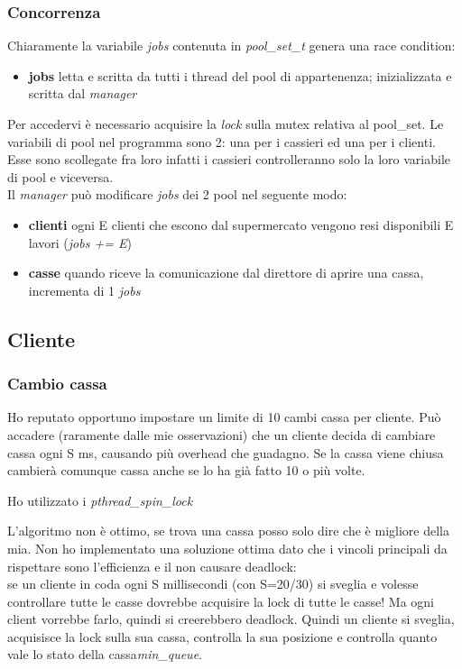 \documentclass[11pt, a4paper]{article}
\begin{document}
\subsubsection{Concorrenza}
Chiaramente la variabile \textit{jobs} contenuta in \textit{pool\_set\_t} genera una race condition:
\begin{itemize}
\item \textbf{jobs}	letta e scritta da tutti i thread del pool di appartenenza; inizializzata e scritta dal \textit{manager}
\end{itemize} 
Per accedervi è necessario acquisire la \textit{lock} sulla mutex relativa al pool\_set. 
Le variabili di pool nel programma sono 2: una per i cassieri ed una per i clienti. Esse sono scollegate fra loro infatti i cassieri controlleranno solo la loro variabile di pool e viceversa.\\
Il \textit{manager} può modificare \textit{jobs} dei 2 pool nel seguente modo:
\begin{itemize}
\item \textbf{clienti}	ogni E clienti che escono dal supermercato vengono resi disponibili E lavori (\textit{jobs += E})
\item \textbf{casse}	quando riceve la comunicazione dal direttore di aprire una cassa, incrementa di 1 \textit{jobs}
\end{itemize}


\subsection{Cliente}
\subsubsection{Cambio cassa}
Ho reputato opportuno impostare un limite di 10 cambi cassa per cliente. Può accadere (raramente dalle mie osservazioni) che un cliente decida di cambiare cassa ogni S ms, causando più overhead che guadagno. Se la cassa viene chiusa cambierà comunque cassa anche se lo ha già fatto 10 o più volte.

Ho utilizzato i \textit{pthread\_spin\_lock}

L'algoritmo non è ottimo, se trova una cassa posso solo dire che è migliore della mia. Non ho implementato una soluzione ottima dato che i vincoli principali da rispettare sono l'efficienza e il non causare deadlock:\\
se un cliente in coda ogni S millisecondi (con S=20/30) si sveglia e volesse controllare tutte le casse dovrebbe acquisire la lock di tutte le casse! Ma ogni client vorrebbe farlo, quindi si creerebbero deadlock. 
Quindi un cliente si sveglia, acquisisce la lock sulla sua cassa, controlla la sua posizione e controlla quanto vale lo stato della cassa\textit{min\_queue}. 
\end{document}
